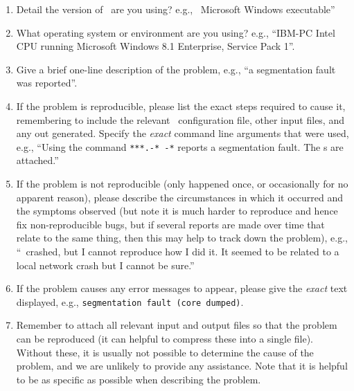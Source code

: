 \begin{enumerate}
\item Detail the version of \CNAME\ are you using? e.g., \CNAME\ \VER Microsoft Windows executable''

\item What operating system or environment are you using? e.g., ``IBM-PC Intel CPU running Microsoft Windows 8.1 Enterprise, Service Pack 1''.

\item Give a brief one-line description of the problem, e.g., ``a segmentation fault was reported''.

\item If the problem is reproducible, please list the exact steps required to cause it, remembering to include the relevant \CNAME\ configuration file, other input files, and any out generated. Specify the \emph{exact} command line arguments that were used, e.g., ``Using the command \texttt{***.-* -*} reports a segmentation fault. The \config s are attached.''

\item If the problem is not reproducible (only happened once, or occasionally for no apparent reason), please describe the circumstances in which it occurred and the symptoms observed (but note it is much harder to reproduce and hence fix non-reproducible bugs, but if several reports are made over time that relate to the same thing, then this may help to track down the problem), e.g., ``\CNAME\ crashed, but I cannot reproduce how I did it. It seemed to be related to a local network crash but I cannot be sure.''

\item If the problem causes any error messages to appear, please give the \emph{exact} text displayed, e.g., \texttt{segmentation fault (core dumped)}.

\item Remember to attach all relevant input and output files so that the problem can be reproduced (it can helpful to compress these into a single file). Without these, it is usually not possible to determine the cause of the problem, and we are unlikely to provide any assistance. Note that it is helpful to be as specific as possible when describing the problem.

\end{enumerate}
